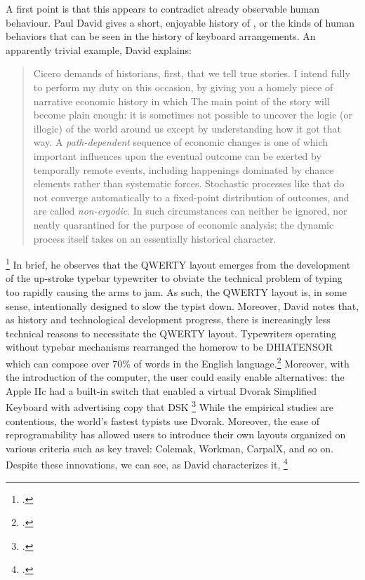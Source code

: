 \documentclass[letterpaper,notitlepage,12pt]{article}
\begin{document}
A first point is that this appears to contradict already observable human
behaviour.
Paul David gives a short, enjoyable history of , or the
kinds of human behaviors that can be seen in the history of keyboard
arrangements.
An apparently trivial example, David explains: \blockquote{Cicero demands of 
  historians, first, that we tell true stories. I intend fully to perform my
 duty on this occasion, by giving you a homely
 piece of narrative economic history in which
  The main
 point of the story will become plain enough:
 it is sometimes not possible to uncover the
 logic (or illogic) of the world around us
 except by understanding how it got that way.
 A \textit{path-dependent} sequence of economic
 changes is one of which important influences
 upon the eventual outcome can be exerted by
 temporally remote events, including happenings dominated by chance elements 
 rather
 than systematic forces. Stochastic processes
 like that do not converge automatically to a
 fixed-point distribution of outcomes, and are
 called \textit{non-ergodic}. In such circumstances
  can neither be ignored,
 nor neatly quarantined for the purpose of
 economic analysis; the dynamic process itself
 takes on an essentially historical character.}\footcite[p.
 332]{david_clio_1985}
In brief, he observes that the QWERTY layout emerges from the development of the
up-stroke typebar typewriter to obviate the technical problem of typing too
rapidly causing the arms to jam.
As such, the QWERTY layout is, in some sense, intentionally designed to slow the
typist down.
Moreover, David notes that, as history and technological development progress,
there is increasingly less technical reasons to necessitate the QWERTY layout.
Typewriters operating without typebar mechanisms rearranged the homerow to be
DHIATENSOR which can compose over 70\% of words in the English
language.\footcite{david_clio_1985}
Moreover, with the introduction of the computer, the user could easily enable
alternatives: the Apple IIc had a built-in switch that enabled a virtual Dvorak
Simplified Keyboard with advertising copy that DSK \footcite[p. 352]{david_clio_1985}
While the empirical studies are contentious, the world's fastest typists use
Dvorak.
Moreover, the ease of reprogramability has allowed users to introduce their own
layouts organized on various criteria such as key travel: Colemak, Workman,
CarpalX, and so on.
Despite these innovations, we can see, as David characterizes it,
\footcite[p.
336]{david_clio_1985}
\end{document}
